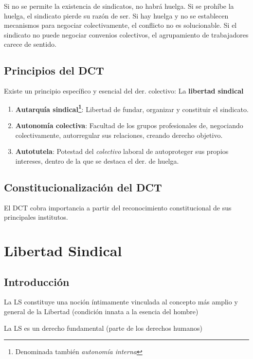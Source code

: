 \documentclass[spanish,12pt,a4paper,titlepage]{report}
\begin{document}
Si no se permite la existencia de sindicatos, no habrá huelga. Si se prohíbe la huelga, el sindicato pierde su razón de ser. Si hay huelga y no se establecen mecanismos para negociar colectivamente, el conflicto no es solucionable. Si el sindicato no puede negociar convenios colectivos, el agrupamiento de trabajadores carece de sentido.

\section{Principios del DCT}
\label{sec:principios-del-dct}

Existe un principio específico y esencial del der. colectivo: La \textbf{libertad sindical}

\begin{enumerate}
\item \textbf{Autarquía sindical\footnote{Denominada también \textit{autonomía interna}}}: Libertad de fundar, organizar y constituir el sindicato.
\item \textbf{Autonomía colectiva}: Facultad de los grupos profesionales de, negociando colectivamente, autorregular sus relaciones, creando derecho objetivo.
\item \textbf{Autotutela}: Potestad del \textit{colectivo} laboral de autoproteger sus propios intereses, dentro de la que se destaca el der. de huelga.
\end{enumerate}

\section{Constitucionalización del DCT}
\label{sec:constitucionalizacion-del-dct}

El DCT cobra importancia a partir del reconocimiento constitucional de sus principales institutos.


\chapter{Libertad Sindical}

\section{Introducción}

La LS constituye una noción íntimamente vinculada al concepto más amplio y general de la Libertad (condición innata a la esencia del hombre)

La LS es un derecho fundamental (parte de los derechos humanos)
\end{document}
